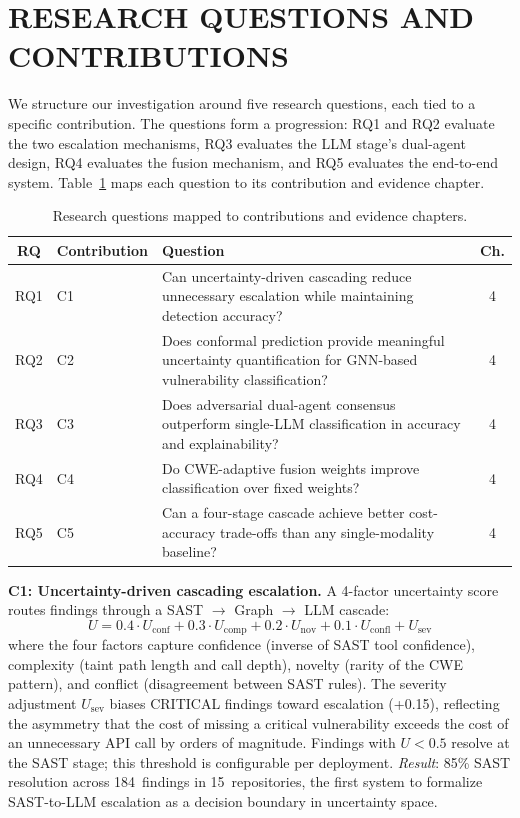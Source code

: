 \section{\uppercase{Research Questions and Contributions}}

We structure our investigation around five research questions, each tied to a specific contribution. The questions form a progression: RQ1 and RQ2 evaluate the two escalation mechanisms, RQ3 evaluates the LLM stage's dual-agent design, RQ4 evaluates the fusion mechanism, and RQ5 evaluates the end-to-end system. Table~\ref{tab:rq-mapping} maps each question to its contribution and evidence chapter.

\begin{table}[H]
\centering
\caption{Research questions mapped to contributions and evidence chapters.}
\label{tab:rq-mapping}
\begin{tabular}{@{}clp{6.5cm}c@{}}
\toprule
\textbf{RQ} & \textbf{Contribution} & \textbf{Question} & \textbf{Ch.} \\
\midrule
RQ1 & C1 & Can uncertainty-driven cascading reduce unnecessary escalation while maintaining detection accuracy? & 4 \\
RQ2 & C2 & Does conformal prediction provide meaningful uncertainty quantification for GNN-based vulnerability classification? & 4 \\
RQ3 & C3 & Does adversarial dual-agent consensus outperform single-LLM classification in accuracy and explainability? & 4 \\
RQ4 & C4 & Do CWE-adaptive fusion weights improve classification over fixed weights? & 4 \\
RQ5 & C5 & Can a four-stage cascade achieve better cost-accuracy trade-offs than any single-modality baseline? & 4 \\
\bottomrule
\end{tabular}
\end{table}

\textbf{C1: Uncertainty-driven cascading escalation.} A 4-factor uncertainty score routes findings through a SAST $\to$ Graph $\to$ LLM cascade:
\begin{equation}
U = 0.4 \cdot U_{\text{conf}} + 0.3 \cdot U_{\text{comp}} + 0.2 \cdot U_{\text{nov}} + 0.1 \cdot U_{\text{confl}} + U_{\text{sev}}
\label{eq:ch1-uncertainty}
\end{equation}
\noindent where the four factors capture confidence (inverse of SAST tool confidence), complexity (taint path length and call depth), novelty (rarity of the CWE pattern), and conflict (disagreement between SAST rules). The severity adjustment $U_{\text{sev}}$ biases CRITICAL findings toward escalation (+0.15), reflecting the asymmetry that the cost of missing a critical vulnerability exceeds the cost of an unnecessary API call by orders of magnitude. Findings with $U < 0.5$ resolve at the SAST stage; this threshold is configurable per deployment. \textit{Result}: 85\% SAST resolution across 184~findings in 15~repositories, the first system to formalize SAST-to-LLM escalation as a decision boundary in uncertainty space.

